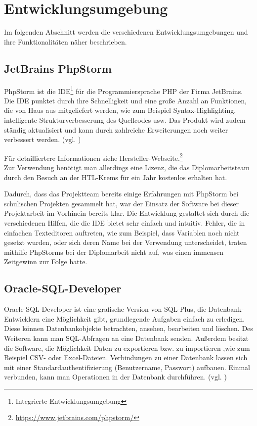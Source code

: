 \section{Entwicklungsumgebung}
Im folgenden Abschnitt werden die verschiedenen Entwicklungsumgebungen und ihre Funktionalitäten näher beschrieben.

\subsection{JetBrains PhpStorm}
PhpStorm ist die IDE\footnote{Integrierte Entwicklungsumgebung} für die Programmiersprache PHP der Firma JetBrains. Die IDE punktet durch ihre Schnelligkeit und eine große Anzahl an Funktionen, die von Haus aus mitgeliefert werden, wie zum Beispiel Syntax-Highlighting, intelligente Strukturverbesserung des Quellcodes usw. Das Produkt wird zudem ständig aktualisiert und kann durch zahlreiche Erweiterungen noch weiter verbessert werden. (vgl. \cite{phpstorm})  

Für detailliertere Informationen siehe Hersteller-Webseite.\footnote{\url{https://www.jetbrains.com/phpstorm/}} \\ 

Zur Verwendung benötigt man allerdings eine Lizenz, die das Diplomarbeitsteam durch den Besuch an der HTL-Krems für ein Jahr kostenlos erhalten hat. 

Dadurch, dass das Projektteam bereits einige Erfahrungen mit PhpStorm bei schulischen Projekten gesammelt hat, war der Einsatz der Software bei dieser Projektarbeit im Vorhinein bereits klar. Die Entwicklung gestaltet sich durch die verschiedenen Hilfen, die die IDE bietet sehr einfach und intuitiv. Fehler, die in einfachen Texteditoren auftreten, wie zum Beispiel, dass Variablen noch nicht gesetzt wurden, oder sich deren Name bei der Verwendung unterscheidet, traten mithilfe PhpStorms bei der Diplomarbeit nicht auf, was einen immensen Zeitgewinn zur Folge hatte.


\subsection{Oracle-SQL-Developer}
Oracle-SQL-Developer ist eine grafische Version von SQL-Plus, die Datenbank-Entwicklern eine Möglichkeit gibt, grundlegende Aufgaben einfach zu erledigen. Diese können Datenbankobjekte betrachten, ansehen, bearbeiten und löschen. Des Weiteren kann man SQL-Abfragen an eine Datenbank senden. Außerdem besitzt die Software, die Möglichkeit Daten zu exportieren bzw. zu importieren ,wie zum Beispiel CSV- oder Excel-Dateien. Verbindungen zu einer Datenbank lassen sich mit einer Standardauthentifizierung (Benutzername, Passwort) aufbauen. Einmal verbunden, kann man Operationen in der Datenbank durchführen. (vgl. \cite{sqldeveloper})

